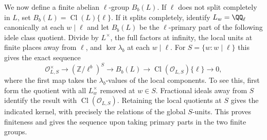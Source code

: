 \documentclass[a4paper,11pt]{article}
\theoremstyle{definition}
\theoremstyle{remark}
\newcommand{\ZZ}{\mathbb Z}\newcommand{\ord}{\operatorname{ord}}
\numberwithin{equation}{section}
\newcommand{\Cl}{\operatorname{Cl}}
\begin{document}
We now define a finite abelian \(\ell\)-group \(B_b(L)\).
If \(\ell\) does not split completely in \(L\), set
\(B_b(L)=\Cl(L)\{\ell\}\). If it splits completely, identify
\(L_w=\QQ_\ell\) canonically at each \(w\mid\ell\) and let
\(B_b(L)\) be the \(\ell\)-primary part of the following idele
class quotient. Divide by \(L^\times\), the full factors at
infinity, the local units at finite places away from \(\ell\),
and \(\ker\lambda_b\) at each \(w\mid\ell\). For \(S=\{w:w\mid\ell\}\)
this gives the exact sequence
\begin{equation}
 \mathcal O_{L,S}^\times\longrightarrow(\ZZ/\ell^b)^S
 \longrightarrow B_b(L)\longrightarrow\Cl(\mathcal O_{L,S})\{\ell\}
 \longrightarrow0,                                             \label{eq:ray101}
\end{equation}
where the first map takes the \(\lambda_b\)-values of the local
components. To see this, first form the quotient with all
\(L_w^\times\) removed at \(w\in S\). Fractional ideals away
from \(S\) identify the result with \(\Cl(\mathcal O_{L,S})\).
Retaining the local quotients at \(S\) gives the indicated kernel,
with precisely the relations of the global \(S\)-units. This
proves finiteness and gives the sequence upon taking primary parts
in the two finite groups.
\end{document}
